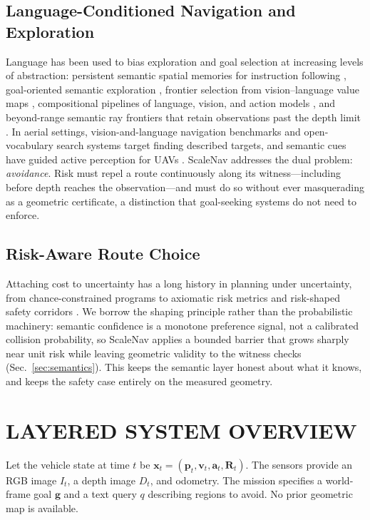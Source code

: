 \documentclass[letterpaper,10pt,conference]{ieeeconf}
\newcommand{\vect}[1]{\boldsymbol{#1}}
\begin{document}
\subsection{Language-Conditioned Navigation and Exploration}
Language has been used to bias exploration and goal selection at increasing
levels of abstraction: persistent semantic spatial memories for instruction
following \cite{blukis}, goal-oriented semantic exploration \cite{semexp},
frontier selection from vision--language value maps \cite{vlfm}, compositional
pipelines of language, vision, and action models \cite{lmnav}, and beyond-range
semantic ray frontiers that retain observations past the depth limit
\cite{rayfronts}.  In aerial settings, vision-and-language navigation
benchmarks \cite{aerialvln} and open-vocabulary search systems
\cite{wildos} target finding described targets, and semantic cues have guided
active perception for UAVs \cite{bartolomei}.  ScaleNav addresses the dual
problem: \emph{avoidance}.  Risk must repel a route continuously along its
witness---including before depth reaches the observation---and must do so
without ever masquerading as a geometric certificate, a distinction that
goal-seeking systems do not need to enforce.

\subsection{Risk-Aware Route Choice}
Attaching cost to uncertainty has a long history in planning under
uncertainty, from chance-constrained programs \cite{blackmore} to axiomatic
risk metrics \cite{majumdar} and risk-shaped safety corridors \cite{rast}.
We borrow the shaping principle rather than the probabilistic machinery:
semantic confidence is a monotone preference signal, not a calibrated
collision probability, so ScaleNav applies a bounded barrier that grows
sharply near unit risk while leaving geometric validity to the witness checks
(Sec.~\ref{sec:semantics}).  This keeps the semantic layer honest about what
it knows, and keeps the safety case entirely on the measured geometry.

\section{LAYERED SYSTEM OVERVIEW}
Let the vehicle state at time $t$ be
$\vect{x}_t=(\vect{p}_t,\vect{v}_t,\vect{a}_t,\vect{R}_t)$.
The sensors provide an RGB image $I_t$, a depth image $D_t$, and odometry.
The mission specifies a world-frame goal $\vect{g}$ and a text query $q$
describing regions to avoid.  No prior geometric map is available.
\end{document}
